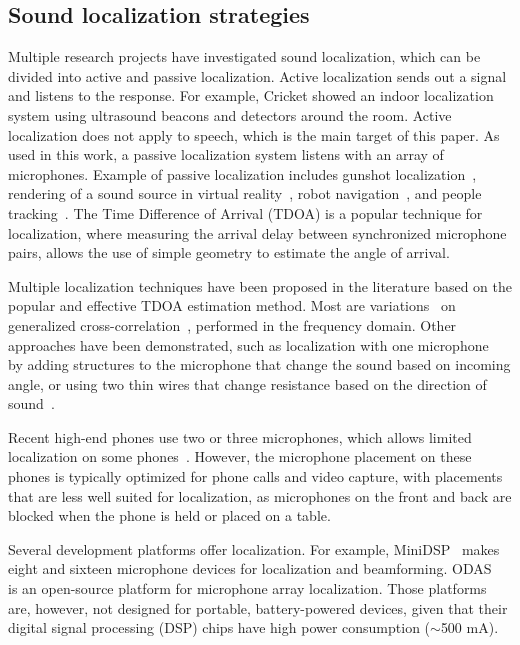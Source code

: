 \subsection{Sound localization strategies} 
Multiple research projects have investigated sound localization, which can be divided into active and passive localization. Active localization sends out a signal and listens to the response. For example, Cricket \cite{Cricket} showed an indoor localization system using ultrasound beacons and detectors around the room. Active localization does not apply to speech, which is the main target of this paper.
As used in this work, a passive localization system listens with an array of microphones. Example of passive localization includes gunshot localization~\cite{valenzise2007scream}, rendering of a sound source in virtual reality~\cite{vr_sound_localization}, robot navigation~\cite{liu2010continuous}, and people tracking~\cite{people_walking_audio_id}. The Time Difference of Arrival (TDOA) is a popular technique for localization, where measuring the arrival delay between synchronized microphone pairs, allows the use of simple geometry to estimate the angle of arrival. 

Multiple localization techniques have been proposed in the literature based on the popular and effective TDOA estimation method. Most are variations~\cite{lee2008maximum,do2007real} on  generalized cross-correlation~\cite{knapp1976generalized}, performed in the frequency domain. Other approaches have been demonstrated, such as localization with one microphone~\cite{saxena2009learning} by adding structures to the microphone that change the sound based on incoming angle, or using two thin wires that change resistance based on the direction of sound~\cite{Sound_loc_and_vis_device}. 

Recent high-end phones use two or three microphones, which allows limited localization on some phones~\cite{phone_localization, phone_localization2}. However, the microphone placement on these phones is typically optimized for phone calls and video capture, with placements that are less well suited for localization, as microphones on the front and back are blocked when the phone is held or placed on a table. 

Several development platforms offer localization. For example, MiniDSP~\cite{MiniDSP} makes eight and sixteen microphone devices for localization and beamforming. ODAS~\cite{grondin2019lightweight} is an open-source platform for microphone array localization. Those platforms are, however, not designed for portable, battery-powered devices, given that their digital signal processing (DSP) chips have high power consumption ($\sim$500 mA).

